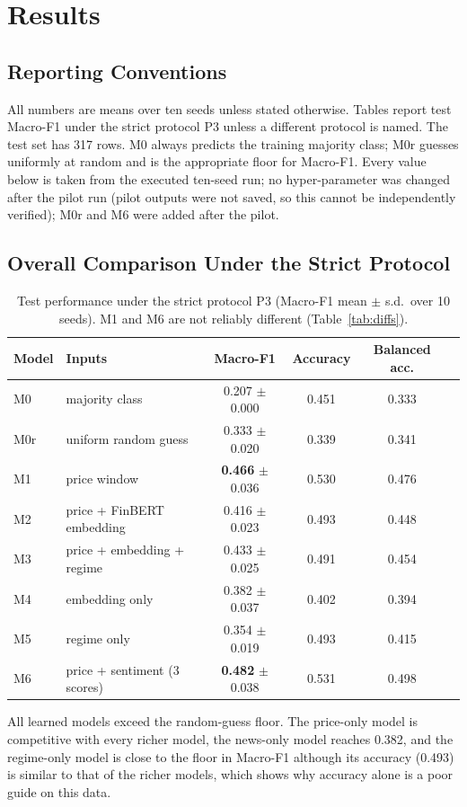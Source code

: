 \newpage
\section{Results}\label{ch:results}
\subsection{Reporting Conventions}
All numbers are means over ten seeds unless stated otherwise. Tables report test Macro-F1 under the strict protocol P3 unless a different protocol is named. The test set has 317 rows. M0 always predicts the training majority class; M0r guesses uniformly at random and is the appropriate floor for Macro-F1. Every value below is taken from the executed ten-seed run; no hyper-parameter was changed after the pilot run (pilot outputs were not saved, so this cannot be independently verified); M0r and M6 were added after the pilot.

\subsection{Overall Comparison Under the Strict Protocol}\label{sec:overall}
\begin{table}[H]
\centering
\begin{tabular}{llcccc}
\toprule
Model & Inputs & Macro-F1 & Accuracy & Balanced acc.\\
\midrule
M0 & majority class & 0.207 $\pm$ 0.000 & 0.451 & 0.333\\
M0r & uniform random guess & 0.333 $\pm$ 0.020 & 0.339 & 0.341\\
M1 & price window & \textbf{0.466} $\pm$ 0.036 & 0.530 & 0.476\\
M2 & price + FinBERT embedding & 0.416 $\pm$ 0.023 & 0.493 & 0.448\\
M3 & price + embedding + regime & 0.433 $\pm$ 0.025 & 0.491 & 0.454\\
M4 & embedding only & 0.382 $\pm$ 0.037 & 0.402 & 0.394\\
M5 & regime only & 0.354 $\pm$ 0.019 & 0.493 & 0.415\\
M6 & price + sentiment (3 scores) & \textbf{0.482} $\pm$ 0.038 & 0.531 & 0.498\\
\bottomrule
\end{tabular}
\caption[Test performance under the strict protocol P3]{Test performance under the strict protocol P3 (Macro-F1 mean $\pm$ s.d.\ over 10 seeds). M1 and M6 are not reliably different (Table~\ref{tab:diffs}).}\label{tab:main}
\end{table}
All learned models exceed the random-guess floor. The price-only model is competitive with every richer model, the news-only model reaches 0.382, and the regime-only model is close to the floor in Macro-F1 although its accuracy (0.493) is similar to that of the richer models, which shows why accuracy alone is a poor guide on this data.

